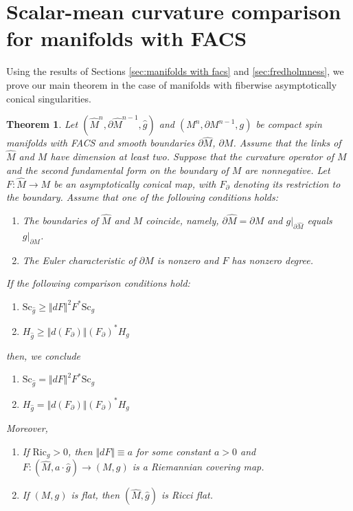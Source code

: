 \documentclass[12pt, reqno]{amsart}
\theoremstyle{plain} %
\newtheorem{theorem}{Theorem}[section]
\theoremstyle{definition}
\theoremstyle{remark}
\numberwithin{equation}{section}
\newcommand{\dom}[1]{\hat{#1}}
\newcommand{\onorm}[1]{\Vert #1 \Vert}
\newcommand{\bnd}[1]{\partial #1}
\newcommand{\Sc}{\mathrm{Sc}}
\newcommand{\Ric}{\mathrm{Ric}}
\newcommand{\tdim}{n} %
\begin{document}
\section{Scalar-mean curvature comparison for manifolds with FACS}\label{sec:scalar-mean curvature comparison results}
Using the results of Sections \ref{sec:manifolds with facs} and \ref{sec:fredholmness}, we prove our main theorem in the case of manifolds with fiberwise asymptotically conical singularities.
\begin{theorem}
    Let \((\dom{M}^{\tdim},\bnd{\dom{M}}^{\tdim-1},\dom{g})\) and \((M^{\tdim},\bnd{M}^{\tdim-1},g)\) be compact spin manifolds with FACS and smooth boundaries \(\bnd{\dom{M}}\), \(\bnd{M}\).
    Assume that the links of \(\dom{M}\) and \(M\) have dimension at least two.
    Suppose that the curvature operator of \(M\) and the second fundamental form on the boundary of \(M\) are nonnegative.
    Let \(F \colon \dom{M} \to M\) be an asymptotically conical map, with \(F_\partial\) denoting its restriction to the boundary.
    Assume that one of the following conditions holds:
    \begin{enumerate}[label=\((\arabic*)\)]
        \item \label{itm:identical boundaries} The boundaries of \(\dom{M}\) and \(M\) coincide, namely, \(\bnd{\dom{M}} = \bnd{M}\) and \(g|_{\bnd{\dom{M}}}\) equals \(g|_{\bnd{M}}\).
        \item \label{itm:nonvanishing euler characteristic} The Euler characteristic of \(\bnd{M}\) is nonzero and \(F\) has nonzero degree.
    \end{enumerate}
    If the following comparison conditions hold:
    \begin{enumerate}[label=\textnormal{(\roman*)}]
        \item \(\Sc_{\dom{g}} \geq \onorm{dF}^2 F^*\Sc_g\)
        \item \(H_{\dom{g}} \geq \onorm{d(F_\partial)} (F_\partial)^*H_g\)
    \end{enumerate}
    then, we conclude
    \begin{enumerate}[label=\textup{(\Roman*)}]
        \item \(\Sc_{\dom{g}} = \onorm{dF}^2 F^* \Sc_g\)
        \item \(H_{\dom{g}} = \onorm{d(F_\partial)} (F_\partial)^*H_g\)
    \end{enumerate}
    Moreover,
    \begin{enumerate}[label=\((\mathrm{\Roman*}^\prime)\)]
        \item \label{itm:covering map} If \(\Ric_g > 0\), then \(\onorm{dF} \equiv a\) for some constant \(a > 0\) and \(F \colon (\dom{M}, a \cdot \dom{g}) \to (M,g)\) is a Riemannian covering map.
        \item \label{itm:flat implies ricci flat} If \((M, g)\) is flat, then \((\dom{M}, \dom{g})\) is Ricci flat.
    \end{enumerate}
\end{theorem}
\end{document}
